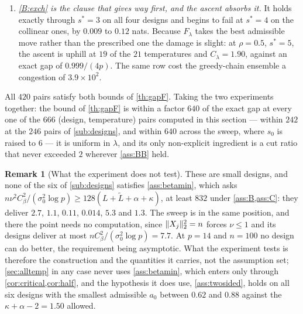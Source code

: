 \documentclass[aos]{imsart}
\DeclarePairedDelimiter{\norm}{\lVert}{\rVert}
\newcommand{\Ltil}{\widetilde{L}}
\theoremstyle{plain}
\theoremstyle{definition}
\newtheorem{remark}{Remark}[section]
\begin{document}
\begin{enumerate}[label=(\roman*),leftmargin=2.6em]
        binomial count $\max_m\binom{s^{\ast}}m=1,2,3,6,10$, and the
        ensemble built on the greedy chain alone --- the one this
        construction replaced --- has exact congestion $1,2,3,6,10$ on the
        same rows and $3.9\times10^{2}$ at $\rho=0.5$, $s^{\ast}=5$. The
        exponential was in the route and in the estimate of it, and both are
        gone.
        \item \emph{\ref{B:exch} is the clause that gives way first, and the
        ascent absorbs it.} It holds exactly through $s^{\ast}=3$ on all
        four designs and begins to fail at $s^{\ast}=4$ on the collinear
        ones, by $0.009$ to $0.12$ nats. Because $F_\lambda$ takes the best
        admissible move rather than the prescribed one the damage is slight:
        at $\rho=0.5$, $s^{\ast}=5$, the ascent is uphill at $19$ of the
        $21$ temperatures and $C_\lambda=1.90$, against an exact gap of
        $0.999/(4p)$. The same row cost the greedy-chain ensemble a
        congestion of $3.9\times10^{2}$.
    \end{enumerate}

    All $420$ pairs satisfy both bounds of \cref{th:gapF}. Taking the two
    experiments together: the bound of \cref{th:gapF} is within a factor
    $640$ of the exact gap at every one of the $666$ (design, temperature)
    pairs computed in this section --- within $242$ at the $246$ pairs of
    \cref{sub:designs}, and within $640$ across the sweep, where $s_0$ is
    raised to $6$ --- it is uniform in $\lambda$, and its only non-explicit
    ingredient is a cut ratio that never exceeded $2$ wherever
    \cref{ass:BB} held.


    \begin{remark}[What the experiment does not test]
        \label{rem:regime}
        These are small designs, and none of the six of \cref{sub:designs}
        satisfies \cref{ass:betamin}, which asks
        $n\nu^{2}C_\beta^{2}/(\sigma_0^{2}\log p)\geq128(L+\Ltil+\alpha
        +\kappa)$, at least $832$ under \cref{ass:B,ass:C}: they deliver
        $2.7$, $1.1$, $0.11$, $0.014$, $5.3$ and $1.3$. The sweep is in the
        same position, and there the point needs no computation, since
        $\norm{X_j}_2^{2}=n$ forces $\nu\leq1$ and its designs deliver at
        most $nC_\beta^{2}/(\sigma_0^{2}\log p)=7.7$. At $p=14$ and $n=100$
        no design can do better, the requirement being asymptotic. What the
        experiment tests is therefore the construction and the quantities it
        carries, not the assumption set; \cref{sec:alltemp} in any case never
        uses \cref{ass:betamin}, which enters only through
        \cref{cor:critical,cor:half}, and the hypothesis it does use,
        \cref{ass:twosided}, holds on all six designs with the smallest
        admissible $a_0$ between $0.62$ and $0.88$ against the
        $\kappa+\alpha-2=1.50$ allowed.
    \end{remark}

    
    
    \appendix
    
\end{document}
